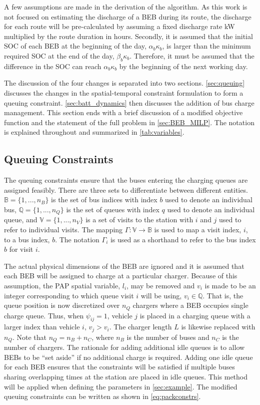 \documentclass[ee,thesis]{usuthesis}
\begin{document}
A few assumptions are made in the derivation of the algorithm. As this work is not focused on estimating the discharge
of a BEB during its route, the discharge for each route will be pre-calculated by assuming a fixed discharge rate kW
multiplied by the route duration in hours. Secondly, it is assumed that the initial SOC of each BEB at the beginning of
the day, $\alpha_b\kappa_b$, is larger than the minimum required SOC at the end of the day, $\beta_b\kappa_b$.
Therefore, it must be assumed that the difference in the SOC can reach $\alpha_b\kappa_b$ by the beginning of the next
working day.

The discussion of the four changes is separated into two sections. \autoref{sec:queuing} discusses the changes in the
spatial-temporal constraint formulation to form a queuing constraint. \autoref{sec:batt_dynamics} then discusses the
addition of bus charge management. This section ends with a brief discussion of a modified objective function and the
statement of the full problem in \autoref{sec:BEB_MILP}. The notation is explained throughout and summarized in
\autoref{tab:variables}.

\subsection{Queuing Constraints}
\label{sec:queuing}
\noindent The queuing constraints ensure that the buses entering the charging queues are assigned
feasibly. There are three sets to differentiate between different entities. \(\mathbb{B} = \{1, ..., n_B\}\) is the set of
bus indices with index \(b\) used to denote an individual bus, \(\mathbb{Q} = \{1, ..., n_Q\}\) is the set of queues with index \(q\)
used to denote an individual queue, and \(\mathbb{V} = \{1, ..., n_V\}\) is a set of visits to the station with \(i\) and
\(j\) used to refer to individual visits. The mapping \(\Gamma: \mathbb{V} \rightarrow \mathbb{B}\) is used to map a visit
index, \(i\), to a bus index, \(b\). The notation \(\Gamma_i\) is used as a shorthand to refer to the bus index \(b\) for visit
\(i\).

The actual physical dimensions of the BEB are ignored and it is assumed that each BEB will be assigned to charge at a
particular charger. Because of this assumption, the PAP spatial variable, \(l_i\), may be removed and \(v_i\) is made to be
an integer corresponding to which queue visit \(i\) will be using, \(v_i \in \mathbb{Q}\). That is, the queue position is now
discretized over \(n_Q\) chargers where a BEB occupies single charge queue. Thus, when \(\psi_{ij} = 1\), vehicle \(j\) is placed
in a charging queue with a larger index than vehicle \(i\), \(v_j > v_i\). The charger length \(L\) is likewise replaced with
\(n_Q\). Note that \(n_Q = n_B + n_C\), where \(n_B\) is the number of buses and \(n_C\) is the number of chargers. The
rationale for adding additional idle queues is to allow BEBs to be ``set aside'' if no additional charge is required.
Adding one idle queue for each BEB ensures that the constraints will be satisfied if multiple buses sharing overlapping
times at the station are placed in idle queues. This method will be applied when defining the parameters in
\autoref{sec:example}. The modified queuing constraints can be written as shown in \autoref{eq:packconstrs}.
\end{document}
